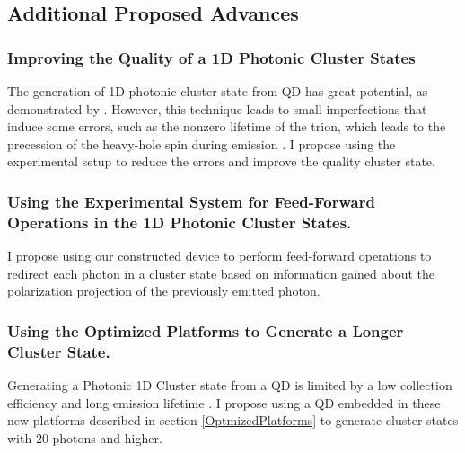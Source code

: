 \subsection{Additional Proposed Advances}
\subsubsection{Improving the Quality of a 1D Photonic Cluster States}
The generation of 1D photonic cluster state from QD has great potential, as demonstrated by \cite{Cogan2023}. However, this technique leads to small imperfections that induce some errors, such as the nonzero lifetime of the trion, which leads to the precession of the heavy-hole spin during emission \cite{Linder2009}. I propose using the experimental setup to reduce the errors and improve the quality cluster state. 
\subsubsection{Using the Experimental System for Feed-Forward Operations in the 1D  Photonic Cluster States.}
I propose using our constructed device to perform feed-forward operations to redirect each photon in a cluster state based on information gained about the polarization projection of the previously emitted photon. 
\subsubsection{Using the Optimized Platforms to Generate a Longer Cluster State.}
Generating a  Photonic 1D Cluster state from a QD is limited by a low collection efficiency and long emission lifetime \cite{Cogan2023}. I propose using a QD embedded in these new platforms described in section \ref{OptmizedPlatforms} to generate cluster states with 20 photons and higher. 
